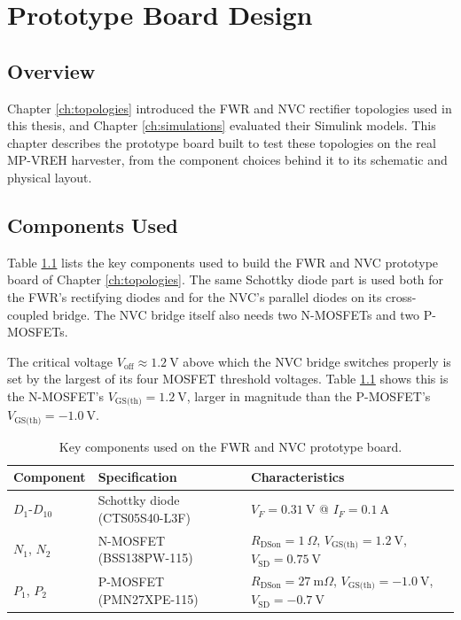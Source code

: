 \chapter{Prototype Board Design}
\label{ch:board_design}

\section{Overview}
\label{sec:board_design_overview}

Chapter \ref{ch:topologies} introduced the FWR and NVC rectifier topologies used in this thesis, and Chapter \ref{ch:simulations} evaluated their Simulink models. This chapter describes the prototype board built to test these topologies on the real MP-VREH harvester, from the component choices behind it to its schematic and physical layout.

\section{Components Used}
\label{sec:components_used}

Table \ref{tab:board_components} lists the key components used to build the FWR and NVC prototype board of Chapter \ref{ch:topologies}. The same Schottky diode part is used both for the FWR's rectifying diodes and for the NVC's parallel diodes on its cross-coupled bridge. The NVC bridge itself also needs two N-MOSFETs and two P-MOSFETs.

The critical voltage $V_\text{off}\approx1.2\ \text{V}$ above which the NVC bridge switches properly is set by the largest of its four MOSFET threshold voltages. Table \ref{tab:board_components} shows this is the N-MOSFET's $V_\text{GS(th)}=1.2\ \text{V}$, larger in magnitude than the P-MOSFET's $V_\text{GS(th)}=-1.0\ \text{V}$.

\begin{table}[h!]
    \centering
    \begin{tabularx}{\textwidth}{l l X}
        \toprule
        Component & Specification & Characteristics \\
        \midrule
        $D_1$-$D_{10}$ & Schottky diode (CTS05S40-L3F) & $V_F=0.31\ \text{V}$ @ $I_F=0.1\ \text{A}$ \\
        $N_1$, $N_2$ & N-MOSFET (BSS138PW-115) & $R_\text{DSon}=1\ \Omega$, $V_\text{GS(th)}=1.2\ \text{V}$, $V_\text{SD}=0.75\ \text{V}$ \\
        $P_1$, $P_2$ & P-MOSFET (PMN27XPE-115) & $R_\text{DSon}=27\ \text{m}\Omega$, $V_\text{GS(th)}=-1.0\ \text{V}$, $V_\text{SD}=-0.7\ \text{V}$ \\
        \bottomrule
    \end{tabularx}
    \caption{Key components used on the FWR and NVC prototype board.}
    \label{tab:board_components}
\end{table}

